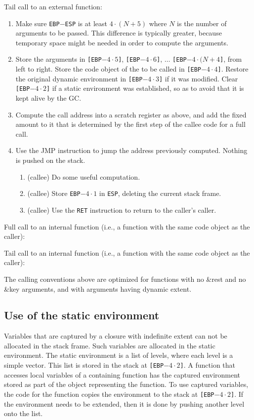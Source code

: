 Tail call to an external function:

\begin{enumerate}
\item Make sure \texttt{EBP}$-$\texttt{ESP} is at least $4 \cdot (N +
  5)$ where $N$ is the number of arguments to be passed.  This
  difference is typically greater, because temporary space might be
  needed in order to compute the arguments.
\item Store the arguments in 
  \texttt{[EBP$- 4 \cdot 5$]}, 
  \texttt{[EBP$- 4 \cdot 6$]}, 
  $\ldots$
  \texttt{[EBP$- 4 \cdot (N + 4$]},
  from left to right.  Store the code object of the to be called in
  \texttt{[EBP$- 4 \cdot 4$]}.  
  Restore the original dynamic environment in 
  \texttt{[EBP$- 4 \cdot 3$]}
  if it was modified.  Clear 
  \texttt{[EBP$- 4 \cdot 2$]} if a static environment was
  established, so as to avoid that it is kept alive by the GC.
\item Compute the call address into a scratch register as above, and
  add the fixed amount to it that is determined by the first step of
  the callee code for a full call.
\item Use the JMP instruction to jump the address previously computed.
  Nothing is pushed on the stack. 
  \begin{enumerate}
  \item (callee) Do some useful computation.
  \item (callee) Store \texttt{EBP$- 4 \cdot 1$} in \texttt{ESP},
    deleting the current stack frame.
  \item (callee) Use the \texttt{RET} instruction to return to the
    caller's caller.
  \end{enumerate}
\end{enumerate}

Full call to an internal function (i.e., a function with the same
code object as the caller):

Tail call to an internal function (i.e., a function with the same
code object as the caller):

The calling conventions above are optimized for functions with no
\&rest and no \&key arguments, and with arguments having dynamic
extent.

\subsection{Use of the static environment}

Variables that are captured by a closure with indefinite extent can
not be allocated in the stack frame.  Such variables are allocated in
the static environment.  The static environment is a list of levels,
where each level is a simple vector.  This list is stored in the stack
at \texttt{[EBP$-4 \cdot 2$]}.  A function that accesses local
variables of a containing function has the captured environment stored
as part of the object representing the function.  To use captured
variables, the code for the function copies the environment to the
stack at \texttt{[EBP$-4 \cdot 2$]}.  If the environment needs to be
extended, then it is done by pushing another level onto the list.

